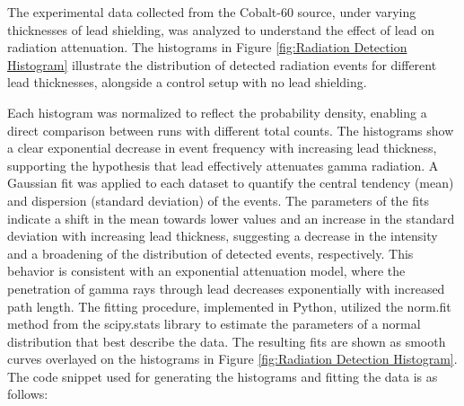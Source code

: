 \documentclass[12pt]{article}
\begin{document}
    The experimental data collected from the Cobalt-60 source, under varying thicknesses of lead shielding, 
    was analyzed to understand the effect of lead on radiation attenuation. The histograms in 
    Figure \ref{fig:Radiation Detection Histogram} illustrate the distribution of detected radiation events for different lead 
    thicknesses, alongside a control setup with no lead shielding.
    
        Each histogram was normalized to reflect the probability density, enabling a direct 
    comparison between runs with different total counts. The histograms show a clear 
    exponential decrease in event frequency with increasing lead thickness, supporting 
    the hypothesis that lead effectively attenuates gamma radiation.
    A Gaussian fit was applied to each dataset to quantify the central tendency (mean) 
    and dispersion (standard deviation) of the events. The parameters of the fits 
    indicate a shift in the mean towards lower values and an increase in the standard 
    deviation with increasing lead thickness, suggesting a decrease in the intensity 
    and a broadening of the distribution of detected events, respectively. This behavior 
    is consistent with an exponential attenuation model, where the penetration of gamma 
    rays through lead decreases exponentially with increased path length.
    The fitting procedure, implemented in Python, utilized the norm.fit method from 
    the scipy.stats library to estimate the parameters of a normal distribution that 
    best describe the data. The resulting fits are shown as smooth curves overlayed on the 
    histograms in Figure \ref{fig:Radiation Detection Histogram}.
    The code snippet used for generating the histograms and fitting the data is as follows:
\end{document}

